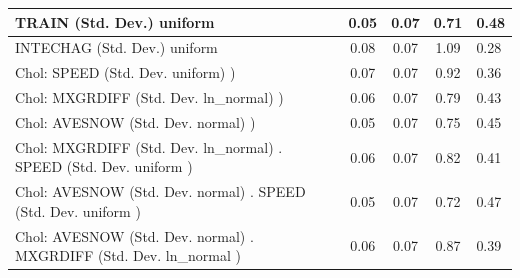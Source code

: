 \begin{table}
\begin{center}
\begin{tabular}{|l|l|c|c|c|l|}
			\hline
			TRAIN (Std. Dev.) uniform &  & 0.05 & 0.07 & 0.71 & 0.48 \\
			\hline
			INTECHAG (Std. Dev.) uniform &  & 0.08 & 0.07 & 1.09 & 0.28 \\
			\hline
			 Chol: SPEED (Std. Dev. uniform) ) &  & 0.07 & 0.07 & 0.92 & 0.36 \\
			\hline
			 Chol: MXGRDIFF (Std. Dev. ln_normal) ) &  & 0.06 & 0.07 & 0.79 & 0.43 \\
			\hline
			 Chol: AVESNOW (Std. Dev. normal) ) &  & 0.05 & 0.07 & 0.75 & 0.45 \\
			\hline
			 Chol: MXGRDIFF (Std. Dev. ln_normal) . SPEED (Std. Dev.   uniform ) &  & 0.06 & 0.07 & 0.82 & 0.41 \\
			\hline
			 Chol: AVESNOW (Std. Dev. normal) . SPEED (Std. Dev.   uniform ) &  & 0.05 & 0.07 & 0.72 & 0.47 \\
			\hline
			 Chol: AVESNOW (Std. Dev. normal) . MXGRDIFF (Std. Dev.   ln_normal ) &  & 0.06 & 0.07 & 0.87 & 0.39 \\
			\hline
		\end{tabular}
	\end{center}
\end{table}